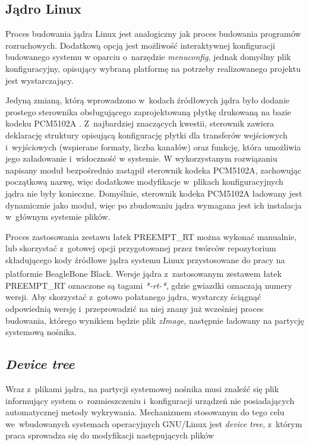 \subsection{Jądro Linux}

Proces budowania jądra Linux jest analogiczny jak proces budowania programów
rozruchowych. Dodatkową opcją jest możliwość interaktywnej konfiguracji
budowanego systemu w oparciu o~narzędzie \textit{menuconfig}, jednak domyślny
plik konfiguracyjny, opisujący wybraną platformę na potrzeby realizowanego
projektu jest wystarczający. \par Jedyną zmianą, którą wprowadzono w~kodach
źródłowych jądra było dodanie prostego sterownika obsługującego zaprojektowaną
płytkę drukowaną na bazie kodeku PCM5102A \cite{bib:sitara}. Z~najbardziej
znaczących kwestii, sterownik zawiera deklarację struktury opisującą
konfigurację płytki dla transferów wejściowych i~wyjściowych (wspierane formaty,
liczba kanałów) oraz funkcję, która umożliwia jego załadowanie i~widoczność w
systemie. W wykorzystanym rozwiązaniu napisany moduł bezpośrednio zastąpił
sterownik kodeka PCM\-5102A, zachowując początkową nazwę, więc dodatkowe
modyfikacje w~plikach konfiguracyjnych jądra nie były konieczne. Domyślnie,
sterownik kodeka PCM5102A ładowany jest dynamicznie jako moduł, więc po
zbudowaniu jądra wymagana jest ich instalacja w~głównym systemie plików.

\par Proces zastosowania zestawu łatek PREEMPT\_RT można wykonać manualnie, lub
skorzystać z~gotowej opcji przygotowanej przez twórców repozytorium składującego
kody źródłowe jądra systemu Linux przystosowane do pracy na platformie
BeagleBone Black\textsuperscript{\textregistered}. Wersje jądra z~zastosowanym
zestawem łatek PREEMPT\_RT oznaczone są tagami \textit{*-rt-*}, gdzie gwiazdki
oznaczają numery wersji. Aby skorzystać z~gotowo połatanego jądra, wystarczy
ściągnąć odpowiednią wersję i~przeprowadzić na niej znany już wcześniej proces
budowania, którego wynikiem będzie plik \textit{zImage}, następnie ładowany na
partycję systemową nośnika.

\subsection{\textit{Device tree}}

Wraz z~plikami jądra, na partycji systemowej nośnika musi znaleźć się plik
informujący system o~rozmieszczeniu i~konfiguracji urządzeń nie posiadających
automatycznej metody wykrywania. Mechanizmem stosowanym do tego celu
we~wbudowanych systemach operacyjnych GNU/Linux jest \textit{device tree},
z~którym praca sprowadza się do modyfikacji następujących plików 

